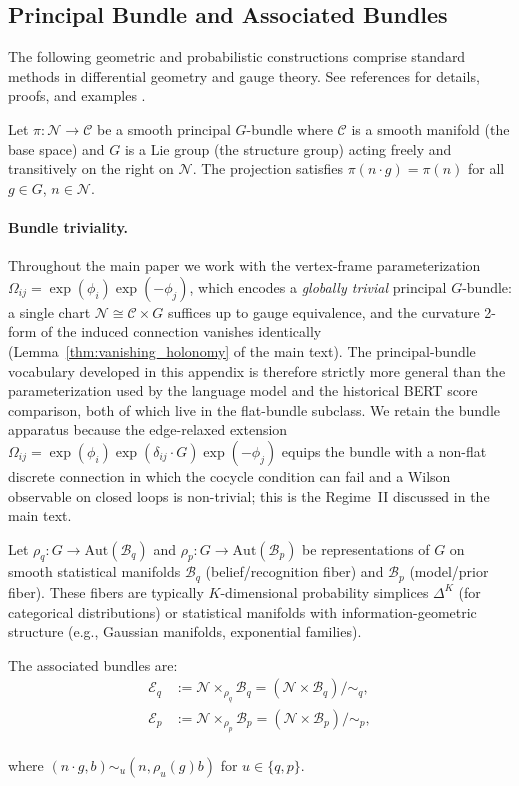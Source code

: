 \documentclass[twoside,11pt]{article}
\begin{document}
\subsection{Principal Bundle and Associated Bundles}

The following geometric and probabilistic constructions comprise standard methods in differential geometry and gauge theory. See references for details, proofs, and examples \citep{nakahara2003geometry,frankel2011geometry,Blei2017,Amari2016}.

Let $\pi: \mathcal{N} \to \mathcal{C}$ be a smooth principal $G$-bundle where $\mathcal{C}$ is a smooth manifold (the base space) and $G$ is a Lie group (the structure group) acting freely and transitively on the right on $\mathcal{N}$. The projection satisfies $\pi(n \cdot g) = \pi(n)$ for all $g \in G$, $n \in \mathcal{N}$.

\paragraph{Bundle triviality.} Throughout the main paper we work with the vertex-frame parameterization $\Omega_{ij} = \exp(\phi_i)\exp(-\phi_j)$, which encodes a \emph{globally trivial} principal $G$-bundle: a single chart $\mathcal{N} \cong \mathcal{C} \times G$ suffices up to gauge equivalence, and the curvature 2-form of the induced connection vanishes identically (Lemma~\ref{thm:vanishing_holonomy} of the main text). The principal-bundle vocabulary developed in this appendix is therefore strictly more general than the parameterization used by the language model and the historical BERT score comparison, both of which live in the flat-bundle subclass. We retain the bundle apparatus because the edge-relaxed extension $\Omega_{ij} = \exp(\phi_i)\exp(\delta_{ij}\cdot G)\exp(-\phi_j)$ equips the bundle with a non-flat discrete connection in which the cocycle condition can fail and a Wilson observable on closed loops is non-trivial; this is the Regime~II discussed in the main text.

Let $\rho_q: G \to \text{Aut}(\mathcal{B}_q)$ and $\rho_p: G \to \text{Aut}(\mathcal{B}_p)$ be representations of $G$ on smooth statistical manifolds $\mathcal{B}_q$ (belief/recognition fiber) and $\mathcal{B}_p$ (model/prior fiber). These fibers are typically $K$-dimensional probability simplices $\Delta^K$ (for categorical distributions) or statistical manifolds with information-geometric structure (e.g., Gaussian manifolds, exponential families).

The associated bundles are:\\
\begin{align}
\mathcal{E}_q &:= \mathcal{N} \times_{\rho_q} \mathcal{B}_q = \left(\mathcal{N} \times \mathcal{B}_q\right)/\sim_q, \\
\mathcal{E}_p &:= \mathcal{N} \times_{\rho_p} \mathcal{B}_p = \left(\mathcal{N} \times \mathcal{B}_p\right)/\sim_p,
\end{align}\\
where $(n \cdot g, b) \sim_u (n, \rho_u(g)b)$ for $u \in \{q,p\}$.
\end{document}
